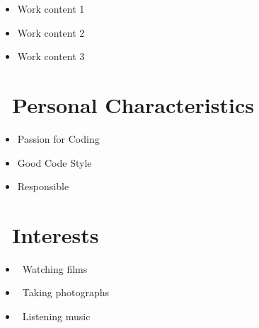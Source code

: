 \documentclass{resume}
\begin{document}
\begin{itemize}[parsep=1ex]
  \item Work content 1
  \item Work content 2
  \item Work content 3
\end{itemize}

\section{\faUser\ Personal Characteristics} \vspace{1mm}

\begin{itemize}[parsep=1ex]
  \item Passion for Coding
  \item Good Code Style
  \item Responsible
\end{itemize}

\section{\faSunO\ Interests} \vspace{1mm}

\begin{itemize}[parsep=1ex]
  \item \faFilm\ {Watching films}
  \item \faCamera\ {Taking photographs}
  \item \faHeadphones\ {Listening music}
\end{itemize}

\end{document}
